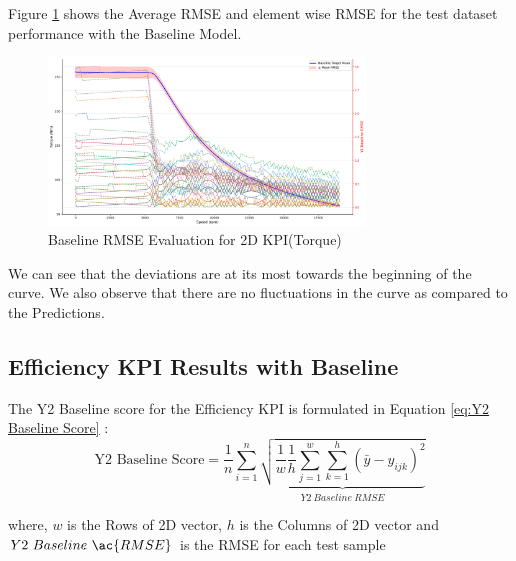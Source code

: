 \documentclass{report} %
\begin{document}
Figure \ref{fig:Baseline RMSE Evaluation for 2D KPI(Torque)} shows the Average \ac{RMSE} and element wise \ac{RMSE} for the test dataset performance with the Baseline Model.\\

\begin{figure}[H]
    \centering
    \includegraphics[width=0.75\textwidth]{./ReportImages/RMSE_Baseline_y1.png} 
    \caption{Baseline \ac{RMSE} Evaluation for 2D KPI(Torque)} 
    \label{fig:Baseline RMSE Evaluation for 2D KPI(Torque)}
\end{figure}

We can see that the deviations are at its most towards the beginning of the curve. 
We also observe that there are no fluctuations in the curve as compared to the Predictions.\\

\subsection{Efficiency \ac{KPI} Results with Baseline}\label{sec:3D Efficiency Grid Results with Baseline}

The Y2 Baseline score for the Efficiency \ac{KPI} is formulated in Equation \ref{eq:Y2 Baseline Score} :
\begin{equation}
    \text{Y2 Baseline Score} = \frac{1}{n} \sum_{i=1}^{n} \underbrace{ \sqrt{\frac{1}{w} \frac{1}{h} \sum_{j=1}^{w} \sum_{k=1}^{h} (\bar{y} - y_{ijk})^2}}_{Y2\ Baseline\ RMSE}
    \label{eq:Y2 Baseline Score}
\end{equation}
    
where, \(w\) is the Rows of 2\ac{D} vector, \(h\) is the Columns of 2\ac{D} vector and \(Y2\ Baseline\ \ac{RMSE}\) is the \ac{RMSE} for each test sample
\end{document}
